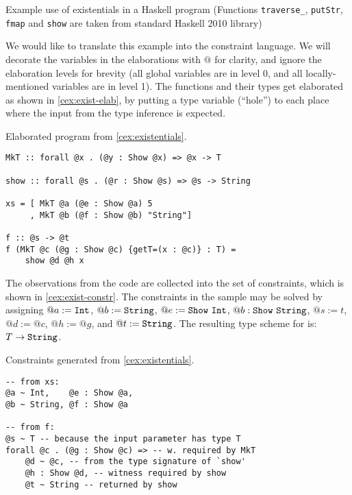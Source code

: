 \begin{codex}

\caption{Example use of existentials in a Haskell program (Functions \texttt{traverse\_}, \texttt{putStr}, \texttt{fmap} and \texttt{show} are taken from standard Haskell 2010 library)}
\label{cex:existentials}
\end{codex}

We would like to translate this example into the constraint language. We will decorate the variables in the elaborations with $@$ for clarity, and ignore the elaboration levels for brevity (all global variables are in level 0, and all locally-mentioned variables are in level 1). The functions and their types get elaborated as shown in \cref{cex:exist-elab}, by putting a type variable (``hole'') to each place where the input from the type inference is expected.

\begin{codex}
\caption{Elaborated program from \cref{cex:existentials}.}
\label{cex:exist-elab}
\begin{lstlisting}[style=haskellStyle]
MkT :: forall @x . (@y : Show @x) => @x -> T

show :: forall @s . (@r : Show @s) => @s -> String

xs = [ MkT @a (@e : Show @a) 5
     , MkT @b (@f : Show @b) "String"]

f :: @s -> @t
f (MkT @c (@g : Show @c) {getT=(x : @c)} : T) =
    show @d @h x
\end{lstlisting}
\end{codex}

The observations from the code are collected into the set of constraints, which is shown in \cref{cex:exist-constr}. The constraints in the sample may be solved by assigning $@a := \mathtt{Int}$, $@b := \mathtt{String}$, $@e := \mathtt{Show}\ \mathtt{Int}$, $@b : \mathtt{Show}\ \mathtt{String}$, $@s := t$, $@d := @c$, $@h := @g$, and $@t := \mathtt{String}$. The resulting type scheme for  is: $T \to \mathtt{String}$.

\begin{codex}
\caption{Constraints generated from \cref{cex:existentials}.}
\label{cex:exist-constr}
\begin{lstlisting}[style=haskellStyle]
-- from xs:
@a ~ Int,    @e : Show @a,
@b ~ String, @f : Show @a

-- from f:
@s ~ T -- because the input parameter has type T
forall @c . (@g : Show @c) => -- w. required by MkT
    @d ~ @c, -- from the type signature of `show'
    @h : Show @d, -- witness required by show
    @t ~ String -- returned by show
\end{lstlisting}
\end{codex}

